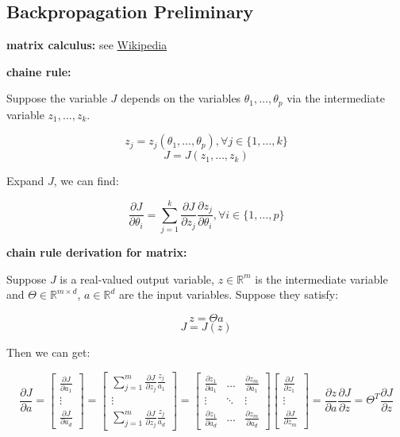 \documentclass{article}
\begin{document}
\subsection{Backpropagation Preliminary}
\textbf{matrix calculus:} see \href{https://en.wikipedia.org/wiki/Matrix_calculus}{Wikipedia}

\textbf{chaine rule:}

Suppose the variable \(J\) depends on the variables \(\theta_1, \dots, \theta_p\) via the intermediate variable \(z_1, \dots, z_k\).

\[z_j = z_j(\theta_1, \dots, \theta_p), \forall j \in \{1, \dots, k\} \]
\[J = J(z_1, \dots, z_k)\]

Expand \(J\), we can find:

\[\frac{\partial J}{\partial \theta_i} = \sum_{j = 1}^{k} \frac{\partial J}{\partial z_j} \frac{\partial z_j}{\partial \theta_i}, \forall i \in \{1, \dots, p\}\]

\textbf{chain rule derivation for matrix:}

Suppose \(J\) is a real-valued output variable, \(z \in \mathbb{R}^m\) is the intermediate variable and \(\Theta \in \mathbb{R}^{m \times d}\), \(a \in \mathbb{R}^d\) are the input variables. Suppose they satisfy:

\[z = \Theta a\]
\[J = J(z)\]

Then we can get:

\[
\frac{\partial J}{\partial a} = 
\begin{bmatrix}
\frac{\partial J}{\partial a_1}\\
\vdots\\
\frac{\partial J}{\partial a_d}
\end{bmatrix}
= 
\begin{bmatrix}
\sum_{j = 1}^m \frac{\partial J}{\partial z_j} \frac{z_j}{a_1}\\
\vdots\\
\sum_{j = 1}^m \frac{\partial J}{\partial z_j} \frac{z_j}{a_d}
\end{bmatrix}
=
\begin{bmatrix}
\frac{\partial z_1}{\partial a_1} & \dots & \frac{\partial z_m}{\partial a_1}\\
\vdots & \ddots & \vdots\\
\frac{\partial z_1}{\partial a_d} & \dots & \frac{\partial z_m}{\partial a_d}
\end{bmatrix}
\begin{bmatrix}
\frac{\partial J}{\partial z_1}\\
\vdots\\
\frac{\partial J}{\partial z_m}
\end{bmatrix}
= \frac{\partial z}{\partial a} \frac{\partial J}{\partial z}
= \Theta^T \frac{\partial J}{\partial z}
\]
\end{document}
